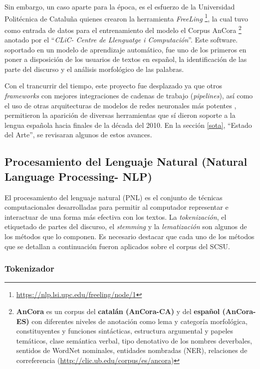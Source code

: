 \documentclass[
  12pt,
  openany]{book}
\begin{document}
Sin embargo, un caso aparte para la época, es el esfuerzo de la Universidad Politécnica de Cataluña quienes crearon la herramienta \emph{FreeLing} \footnote{\url{https://nlp.lsi.upc.edu/freeling/node/1}}, la cual tuvo como entrada de datos para el entrenamiento del modelo el Corpus AnCora \footnote{\textbf{AnCora} es un corpus del \textbf{catalán (AnCora-CA)} y del \textbf{español (AnCora-ES)} con diferentes niveles de anotación como lema y categoría morfológica, constituyentes y funciones sintácticas, estructura argumental y papeles temáticos, clase semántica verbal, tipo denotativo de los nombres deverbales, sentidos de WordNet nominales, entidades nombradas (NER), relaciones de correferencia (\url{http://clic.ub.edu/corpus/es/ancora})} anotado por el ``\emph{CLiC- Centre de Llenguatge i Computación}''. Este software. soportado en un modelo de aprendizaje automático, fue uno de los primeros en poner a disposición de los usuarios de textos en español, la identificación de las parte del discurso y el análisis morfológico de las palabras.

Con el trancurrir del tiempo, este proyecto fue desplazado ya que otros \emph{frameworks} con mejores integraciones de cadenas de trabajo (\emph{pipelines}), así como el uso de otras arquitecturas de modelos de redes neuronales más potentes \citep{chen2014fast}, permitieron la aparición de diversas herramientas que sí dieron soporte a la lengua española hacia finales de la década del 2010. En la sección \ref{sota}, ``Estado del Arte'', se revisaran algunos de estos avances.

\hypertarget{nlproc}{%
\subsection{Procesamiento del Lenguaje Natural (Natural Language Processing- NLP)}\label{nlproc}}

El procesamiento del lenguaje natural (PNL) es el conjunto de técnicas computacionales desarrolladas para permitir al computador representar e interactuar de una forma más efectiva con los textos. La \emph{tokenización}, el etiquetado de partes del discurso, el \emph{stemming} y la \emph{lematización} son algunos de los métodos que lo componen. Es necesario destacar que cada uno de los métodos que se detallan a continuación fueron aplicados sobre el corpus del SCSU.

\hypertarget{token}{%
\subsubsection{Tokenizador}\label{token}}
\end{document}
